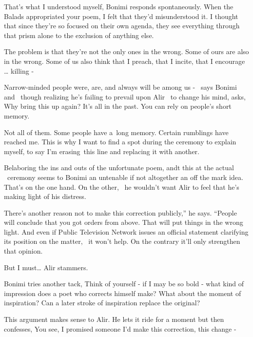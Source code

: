 \documentclass[letterpaper]{article}
\begin{document}
{\textquotedbl}That's what I understood myself,{\textquotedbl} Bonimi responds spontaneously. {\textquotedbl}When the
Balads appropriated your poem, I felt that they'd misunderstood it. I thought that since they're so focused on their
own agenda, they see everything through that prism alone to the exclusion of anything else.{\textquotedbl} 

{\textquotedbl}The problem is that they're not the only ones in the wrong. Some of ours are also in the wrong. Some of
us also think that I preach, that I incite, that I encourage {\dots} killing -{\textquotedbl} 

{\textquotedbl}Narrow-minded people were, are, and always will be among us - {\textquotedbl} \ says Bonimi and \ though
realizing he's failing to prevail upon Alir \ to change his mind, asks, {\textquotedbl}Why bring this up again? It's
all in the past. You can rely on people's short memory.{\textquotedbl} 

{\textquotedbl}Not all of them. Some people have a~long memory. Certain rumblings have reached me. This is why I want to
find a spot during the ceremony to explain myself, to say I'm erasing~this line and replacing it with
another.{\textquotedbl}

Belaboring the ins and outs of the unfortunate poem, andt this at the actual \ ceremony seems to Bonimi an untenable if
not altogether an off the mark idea. That's on the one hand. On the other, \ he wouldn't want Alir to feel that he's
making light of his distress. 

{\textquotedbl}There's another reason not to make this correction publicly,'' he says. ``People will conclude that you
got orders from above. That will put things in the wrong light. And even if Public Television Network issues an
official statement clarifying its position on the matter, \ it won't help. On the contrary it'll only strengthen that
opinion.{\textquotedbl} 

{\textquotedbl}But I must{\dots}{\textquotedbl} Alir stammers. 

Bonimi tries another tack, {\textquotedbl}Think of yourself - if I may be so bold - what kind of impression does a poet
who corrects himself make? What about the moment of inspiration? Can a later stroke of inspiration replace the
original?{\textquotedbl} 

This argument makes sense to Alir. He lets it ride for a moment but then confesses, {\textquotedbl}You see, I promised
someone I'd make this correction, this change -{\textquotedbl} 
\end{document}

